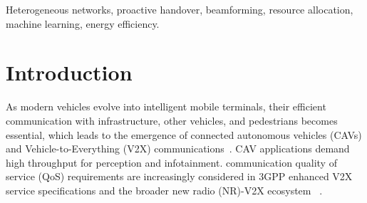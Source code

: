 \documentclass[conference, a4paper]{IEEEtran}
\newcommand{\rev}[1]{\textcolor{revisioncolor}{{}#1}}
\newif\ifshowdeletions
\newcommand{\currentdel}[1]{\ifshowdeletions\textcolor{deletioncolor}{\sout{#1}}\fi}
\theoremstyle{remark}
\begin{document}
\begin{IEEEkeywords}
Heterogeneous networks, proactive handover, beamforming, resource allocation, machine learning, energy efficiency.
\end{IEEEkeywords}

\section{Introduction}

As modern vehicles evolve into intelligent mobile terminals, their efficient communication with infrastructure, other vehicles, and pedestrians becomes essential, which leads to the emergence of connected autonomous vehicles (CAVs) and Vehicle-to-Everything (V2X) communications~\cite{c-v2x}. CAV applications demand \currentdel{a mix of} high throughput for perception and infotainment\currentdel{,}\currentdel{\space ultra-reliable and low-latency communication (uRLLC) for cooperative safety, and high energy efficiency}. \currentdel{Such diverse} communication quality of service (QoS) requirements are increasingly considered in 3GPP enhanced V2X service specifications and the broader new radio (NR)-V2X ecosystem
~\cite{3GPP-TS-22.186,bagheri2020nrv2x}. 
\end{document}
